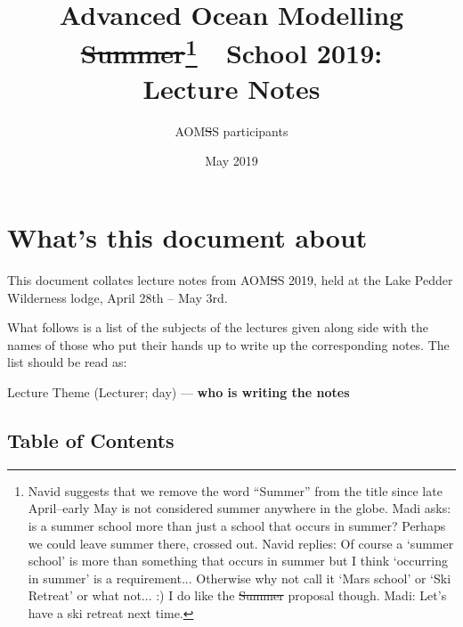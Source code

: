 \documentclass[a4paper]{article}
\title{Advanced Ocean Modelling \st{Summer}\footnote{Navid suggests that we remove the word ``Summer'' from the title since late April--early May is not considered summer anywhere in the globe. Madi asks: is a summer school more than just a school that occurs in summer? Perhaps we could leave summer there, crossed out. Navid replies: Of course a `summer school' is more than something that occurs in summer but I think `occurring in summer' is a requirement... Otherwise why not call it `Mars school' or `Ski Retreat' or what not... :) I do like the \st{Summer} proposal though. Madi: Let's have a ski retreat next time. \rightthumbsup}\ \ School 2019:\\Lecture Notes}
\author{AOM\st{S}S participants}
\date{May 2019}
\numberwithin{equation}{section}
\numberwithin{figure}{section}
\begin{document}
\maketitle

\section*{What's this document about}

This document collates lecture notes from AOM\st{S}S 2019, held at the Lake Pedder Wilderness lodge, April 28th -- May 3rd.

\vspace{1em}

What follows is a list of the subjects of the lectures given along side with the names of those who put their hands up to write up the corresponding notes. The list should be read as:

\vspace{1em}

Lecture Theme (Lecturer; day) --- \textbf{who is writing the notes}

\vspace{2em}

\subsection*{Table of Contents}
\end{document}
